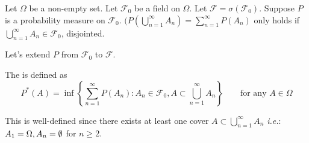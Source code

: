 \documentclass[class=article,crop=false]{standalone}
\begin{document}
Let $\Omega$ be a non-empty set. Let $\mathcal{F}_0$ be a field on $\Omega$. Let $\mathcal{F} = \sigma(\mathcal{F}_0)$. Suppose $P$ is a probability measure on  $\mathcal{F}_0$. $(P(\bigcup_{n= 1}^{\infty} A_n) = \sum_{ n=1}^{\infty} P(A_n)$ only holds if $\bigcup_{n= 1}^{\infty} A_n \in \mathcal{F}_0$, disjointed.

Let's extend $P$ from  $\mathcal{F}_0$ to $\mathcal{F}$.

\begin{defn}
	The  is defined as 
	\[
		P^* (A) = \inf\left\{\sum_{ n=1}^{\infty} P(A_n): A_n \in \mathcal{F}_0, A \subset \bigcup_{n= 1}^{\infty} A_n\right\} \qquad \text{for any } A \in \Omega 
	\]
\end{defn}
\begin{note}[]
This is well-defined since there exists at least one cover $A \subset  \bigcup_{n= 1}^{\infty} A_n$ \emph{i.e.}:  $A_1 = \Omega, A_n=\emptyset$ for $n \geq 2$.
\end{note}
\end{document}
